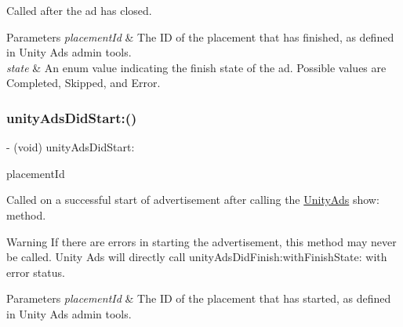 Called after the ad has closed.


\begin{DoxyParams}{Parameters}
{\em placement\+Id} & The ID of the placement that has finished, as defined in Unity Ads admin tools. \\
\hline
{\em state} & An enum value indicating the finish state of the ad. Possible values are {\ttfamily Completed}, {\ttfamily Skipped}, and {\ttfamily Error}. \\
\hline
\end{DoxyParams}
\mbox{\label{protocol_unity_ads_delegate-p_a04f51d2948959482a526886a72a6769b}} 
\subsubsection{\texorpdfstring{unityAdsDidStart:()}{unityAdsDidStart:()}}
{\footnotesize\ttfamily -\/ (void) unity\+Ads\+Did\+Start\+: \begin{DoxyParamCaption}\item[{(N\+S\+String $\ast$)}]{placement\+Id }\end{DoxyParamCaption}}

Called on a successful start of advertisement after calling the {\ttfamily \mbox{\hyperlink{interface_unity_ads}{Unity\+Ads}}} {\ttfamily show\+:} method.

\begin{DoxyWarning}{Warning}
If there are errors in starting the advertisement, this method may never be called. Unity Ads will directly call {\ttfamily unity\+Ads\+Did\+Finish\+:with\+Finish\+State\+:} with error status.
\end{DoxyWarning}

\begin{DoxyParams}{Parameters}
{\em placement\+Id} & The ID of the placement that has started, as defined in Unity Ads admin tools. \\
\hline
\end{DoxyParams}
\mbox{\label{protocol_unity_ads_delegate-p_a8fc6e8a10ffb53dbc8f4c84312e4d544}} 
